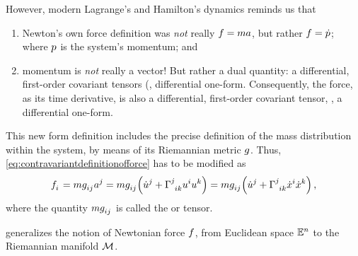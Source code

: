 However, modern Lagrange's and Hamilton's dynamics reminds us that
%
\begin{enumerate}
  \item Newton's own force definition was \emph{not} really $f = ma$, but rather $f = \dot{p}$; where $p$ is the system's momentum; and
  \item momentum  is \emph{not} really a vector! But rather a dual quantity: a differential, first-order covariant tensors (\aka, differential one-form. Consequently, the force, as its time derivative, is also a differential, first-order covariant tensor, \aka, a differential one-form.
\end{enumerate}
%
This new form definition includes the precise definition of the mass distribution within the system, by means of its Riemannian metric $g$. Thus, \cref{eq:contravariantdefinitionofforce} has to be modified as 
%
\begin{equation}\label{eq:covariantdefinitionofforce}
  \tcov\force i = \mass\tcovmet ij\tvec\acc j
                = \mass\tcovmet ij\parens{\tvec{\dt\vel} j + \skchris jik\tvec\vel i\tvec\vel k}
                = \mass\tcovmet ij\parens{\tvec{\dt\vel} j + \skchris jik\tvec{\dt\pos} i\tvec{\dt\pos} k}\,,
\end{equation}
%
where the quantity $\mass\tcovmet ij$ is called the  or  tensor.

 generalizes the notion of Newtonian force $f$, from Euclidean space $\mathbb{E}^{n}$ to the Riemannian manifold $\manifold M$.


